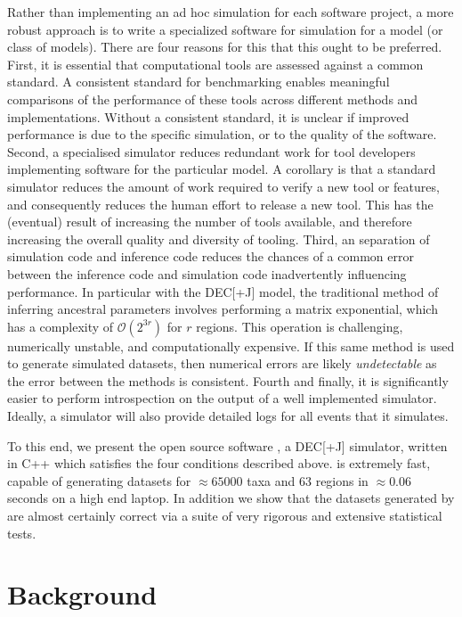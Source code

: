 \documentclass{article}
\begin{document}
Rather than implementing an ad hoc simulation for each software project, a more
robust approach is to write a specialized software for simulation for a model
(or class of models).
There are four reasons for this that this ought to be preferred.
First, it is essential that computational tools are assessed against a common
standard.
A consistent standard for benchmarking enables meaningful comparisons of the
performance of these tools across different methods and implementations.
Without a consistent standard, it is unclear if improved performance is due to
the specific simulation, or to the quality of the software. 
Second, a specialised simulator reduces redundant work for tool developers
implementing software for the particular model.
A corollary is that a standard simulator reduces the amount of work required to
verify a new tool or features, and consequently reduces the human effort to
release a new tool.
This has the (eventual) result of increasing the number of tools available, and
therefore increasing the overall quality and diversity of tooling.
Third, an separation of simulation code and inference code reduces the chances
of a common error between the inference code and simulation code inadvertently
influencing performance.
In particular with the DEC[+J] model, the traditional method of inferring
ancestral parameters involves performing a matrix exponential, which has a
complexity of $\mathcal{O}(2^{3r})$ for $r$ regions\cite{bettisworth_lagrange-ng_2023}.
This operation is challenging, numerically unstable, and computationally
expensive.
If this same method is used to generate simulated datasets, then numerical
errors are likely \textit{undetectable} as the error between the methods is
consistent.
Fourth and finally, it is significantly easier to perform introspection on the
output of a well implemented simulator.
Ideally, a simulator will also provide detailed logs for all events that it
simulates.

To this end, we present the open source software \bigrig{}, a DEC[+J] simulator,
written in C++ which satisfies the four conditions described above.
\bigrig{} is extremely fast, capable of generating datasets for $\approx65000$
taxa and 63 regions in $\approx0.06$ seconds on a high end laptop.
In addition we show that the datasets generated by \bigrig{} are almost
certainly correct via a suite of very rigorous and extensive statistical tests.

\section{Background}
\end{document}
